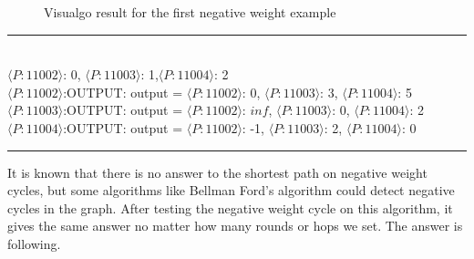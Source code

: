\documentclass[11pt]{article}  %
\begin{document}
\begin{figure}[htbp]
\centering
{}
\quad
{}
\quad
{}
\caption{ Visualgo result for the first negative weight example}
\end{figure}\par

\noindent
\rule{5in}{.1pt}
\noindent \\
{$\langle P:11002\rangle $: 0, $\langle P:11003\rangle$: 1,$\langle P:11004\rangle$: 2}\\
$\langle P:11002\rangle$:OUTPUT: output = {$\langle P:11002\rangle$: 0, $\langle P:11003\rangle$: 3, $\langle P:11004\rangle$: 5}\\
$\langle P:11003\rangle$:OUTPUT: output = {$\langle P:11002\rangle$: $inf$, $\langle P:11003\rangle$: 0, $\langle P:11004\rangle$: 2}\\
$\langle P:11004\rangle$:OUTPUT: output = {$\langle P:11002\rangle$: -1, $\langle P:11003\rangle$: 2, $\langle P:11004\rangle$: 0}\\
\rule{5in}{.1pt}\par

It is known that there is no answer to the shortest path on negative weight cycles, but some algorithms like Bellman Ford's algorithm could detect negative cycles in the graph. After testing the negative weight cycle on this algorithm, it gives the same answer no matter how many rounds or hops we set. The answer is following.\par
\end{document}
